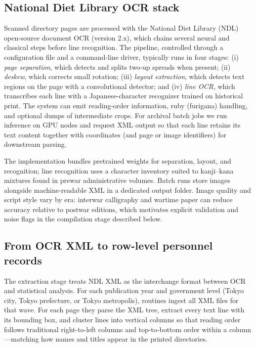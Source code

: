 \subsection{National Diet Library OCR stack}
\label{sec:appendix-digitization}

Scanned directory pages are processed with the National Diet Library (NDL) open-source document OCR (version 2.x), which chains several neural and classical steps before line recognition. The pipeline, controlled through a configuration file and a command-line driver, typically runs in four stages: (i) \emph{page separation}, which detects and splits two-up spreads when present; (ii) \emph{deskew}, which corrects small rotation; (iii) \emph{layout extraction}, which detects text regions on the page with a convolutional detector; and (iv) \emph{line OCR}, which transcribes each line with a Japanese-character recognizer trained on historical print. The system can emit reading-order information, ruby (furigana) handling, and optional dumps of intermediate crops. For archival batch jobs we run inference on GPU nodes and request XML output so that each line retains its text content together with coordinates (and page or image identifiers) for downstream parsing.

The implementation bundles pretrained weights for separation, layout, and recognition; line recognition uses a character inventory suited to kanji--kana mixtures found in prewar administrative volumes. Batch runs store images alongside machine-readable XML in a dedicated output folder. Image quality and script style vary by era: interwar calligraphy and wartime paper can reduce accuracy relative to postwar editions, which motivates explicit validation and noise flags in the compilation stage described below.

\subsection{From OCR XML to row-level personnel records}

The extraction stage treats NDL XML as the interchange format between OCR and statistical analysis. For each publication year and government level (Tokyo city, Tokyo prefecture, or Tokyo metropolis), routines ingest all XML files for that wave. For each page they parse the XML tree, extract every text line with its bounding box, and cluster lines into vertical columns so that reading order follows traditional right-to-left columns and top-to-bottom order within a column---matching how names and titles appear in the printed directories.

